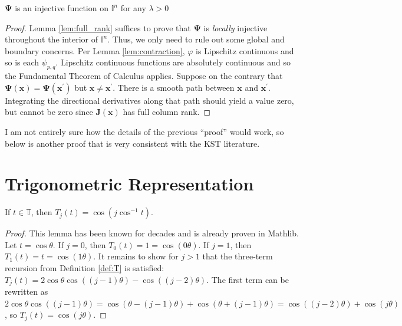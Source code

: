 \begin{proposition}
  $\boldsymbol{\Psi}$ is an injective function on $\mathbb{I}^n$ for any $\lambda > 0$
\end{proposition}
\begin{proof}
  Lemma \ref{lem:full_rank} suffices to prove that $\boldsymbol{\Psi}$ is \emph{locally} injective throughout the interior of $\mathbb{I}^n$. Thus, we only need to rule out some global and boundary concerns. Per Lemma \ref{lem:contraction}, $\varphi$ is Lipschitz continuous and so is each $\psi_{p,q}$. Lipschitz continuous functions are absolutely continuous and so the Fundamental Theorem of Calculus applies. Suppose on the contrary that $\boldsymbol{\Psi}\left(\mathbf{x}\right) = \boldsymbol{\Psi}\left(\mathbf{x}^\prime\right)$ but $\mathbf{x} \neq \mathbf{x}^\prime$. There is a smooth path between $\mathbf{x}$ and $\mathbf{x}^\prime$. Integrating the directional derivatives along that path should yield a value zero, but cannot be zero since $\mathbf{J}\left(\mathbf{x}\right)$ has full column rank.
\end{proof}
\begin{remark*}
  I am not entirely sure how the details of the previous ``proof'' would work, so below is another proof that is very consistent with the KST literature.
\end{remark*}

\section{Trigonometric Representation}\label{sec:TrigonometricRepresentation}

\begin{lemma}[]
  \label{lem:trigonometric}
  \leanok
  If $t \in \mathbb{T}$, then $T_j\left(t\right) = \cos\left(j \cos^{-1}t\right)$.
\end{lemma}
  
\begin{proof}
  \leanok
  This lemma has been known for decades and is already proven in Mathlib. Let $t = \cos \theta$. If $j = 0$, then $T_0\left(t\right) = 1 = \cos\left(0 \theta\right)$. If $j = 1$, then $T_1\left(t\right) = t = \cos\left(1 \theta\right)$. It remains to show for $j > 1$ that the three-term recursion from Definition \ref{def:T} is satisfied: $T_j\left(t\right) = 2 \cos \theta \cos\left(\left(j - 1\right) \theta\right) - \cos\left(\left(j - 2\right) \theta\right)$. The first term can be rewritten as $2\cos \theta \cos\left(\left(j - 1\right) \theta\right) = \cos\left(\theta - \left(j - 1\right)\theta\right) + \cos\left(\theta + \left(j - 1\right)\theta\right) = \cos\left(\left(j - 2\right)\theta\right) + \cos\left(j \theta\right)$, so $T_j\left(t\right) = \cos\left(j \theta\right)$.
\end{proof}


